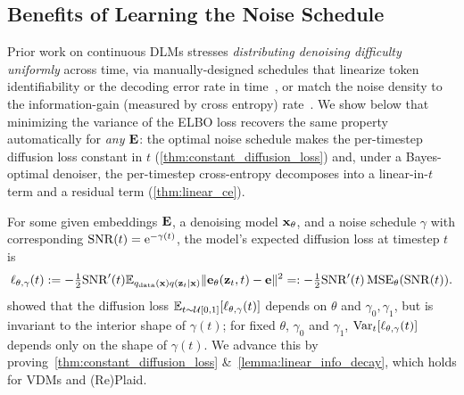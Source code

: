 \documentclass{article}
\begin{document}
%

\subsection{Benefits of Learning the Noise Schedule} 
\label{subsec:learning-noise-schedule}
%

Prior work on continuous DLMs stresses \textit{distributing denoising difficulty uniformly} across time, via manually-designed schedules that linearize token identifiability or the decoding error rate in time~\citep{pynadath2025candi,lee2026flow,potaptchik2026discrete}, or match the noise density to the information-gain (measured by cross entropy) rate~\citep{chen2026langflow}. We show below that minimizing the variance of the ELBO loss recovers the same property automatically for \textit{any} ${\mathbf E}$: the optimal noise schedule makes the per-timestep diffusion loss constant in $t$ (\cref{thm:constant_diffusion_loss}) and, under a Bayes-optimal denoiser, the per-timestep cross-entropy decomposes into a linear-in-$t$ term and a residual term (\cref{thm:linear_ce}). 

%

%
%

%
%
%
%
%



%


%
%
    
%


    

%
%

For some given embeddings ${\mathbf E}$, a denoising model ${\mathbf x}_\theta$, and a noise schedule $\gamma$ with corresponding ${\mathrm{SNR}}(t)={\mathrm{e}}^{-\gamma(t)}$, the model's expected diffusion loss at timestep $t$ is
\begin{align}\label{eq:diffusion-loss-per-t}
    \ell_{\theta, \gamma}(t) := -\tfrac{1}{2} {\mathrm{SNR}}'(t) \mathbb{E}_{q_{\mathrm{data}}({\mathbf x}) q({\mathbf z}_t \mid {\mathbf x})}\| {\mathbf e}_\theta({\mathbf z}_t, t) - {\mathbf e} \|^2 =: -\tfrac{1}{2} {\mathrm{SNR}}'(t) \operatorname{MSE}_\theta({\mathrm{SNR}}(t)).
\end{align}
\citet{kingma2021variational} showed that the diffusion loss  $\mathbb{E}_{t\sim\mathcal{U}[0,1]}[\ell_{\theta, \gamma}(t)]$ depends on $\theta$ and $\gamma_0,\gamma_1$, but is invariant to the interior shape of $\gamma(t)$; for fixed $\theta$, $\gamma_0$ and $\gamma_1$, $\operatorname{Var}_t [\ell_{\theta, \gamma}(t)]$ depends only on the shape of $\gamma(t)$. We advance this by proving~\cref{thm:constant_diffusion_loss} \&~\cref{lemma:linear_info_decay}, which holds for VDMs and (Re)Plaid.
\end{document}
